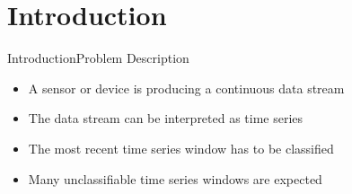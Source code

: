 \section{Introduction}
\begin{frame}{Introduction}{Problem Description}
    \begin{itemize}
        \item A sensor or device is producing a continuous data stream
        \pause
        \item The data stream can be interpreted as time series
        \pause
        \item The most recent time series window has to be classified
        \pause
        \item Many unclassifiable time series windows are expected
    \end{itemize}
\end{frame}
